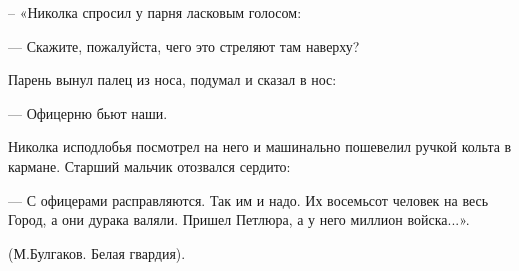  
 
 
 
 


– «Николка спросил у парня ласковым голосом:

— Скажите, пожалуйста, чего это стреляют там наверху?

Парень вынул палец из носа, подумал и сказал в нос:

— Офицерню бьют наши.

Николка исподлобья посмотрел на него и машинально пошевелил ручкой кольта в
кармане. Старший мальчик отозвался сердито:

— С офицерами расправляются. Так им и надо. Их восемьсот человек на весь Город,
а они дурака валяли. Пришел Петлюра, а у него миллион войска...».

(М.Булгаков. Белая гвардия).
